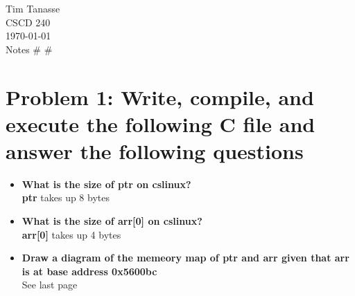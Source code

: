 \documentclass{article}
\begin{document}
\begin{flushright}
  Tim Tanasse\\
  CSCD 240\\
  \today \\
  Notes \# \# \\
\end{flushright}
\section*{Problem 1: Write, compile, and execute the following C file and answer the following questions}
\begin{itemize}
  \item \textbf{What is the size of ptr on cslinux?}\\
  \textbf{ptr} takes up 8 bytes
  \item \textbf{What is the size of arr[0] on cslinux?}\\
  \textbf{arr[0]} takes up 4 bytes
  \item \textbf{Draw a diagram of the memeory map of ptr and arr given that arr is at base address 0x5600bc}\\
  See last page
\end{itemize}
\end{document}
